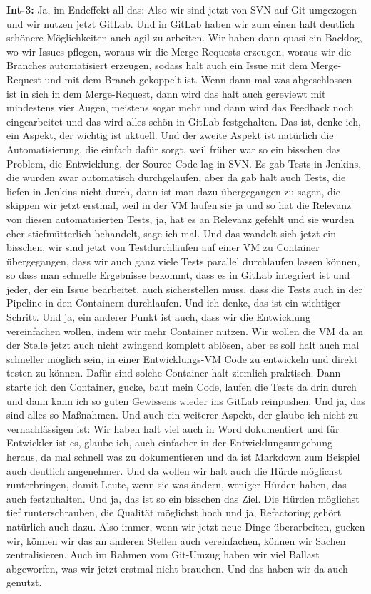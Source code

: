 \textbf{Int-3:} Ja, im Endeffekt all das: Also wir sind jetzt von SVN auf Git umgezogen und wir nutzen jetzt GitLab. Und in GitLab haben wir zum einen halt deutlich schönere Möglichkeiten auch agil zu arbeiten. Wir haben dann quasi ein Backlog, wo wir Issues pflegen, woraus wir die Merge-Requests erzeugen, woraus wir die Branches automatisiert erzeugen, sodass halt auch ein Issue mit dem Merge-Request und mit dem Branch gekoppelt ist. Wenn dann mal was abgeschlossen ist in sich in dem Merge-Request, dann wird das halt auch gereviewt mit mindestens vier Augen, meistens sogar mehr und dann wird das Feedback noch eingearbeitet und das wird alles schön in GitLab festgehalten. Das ist, denke ich, ein Aspekt, der wichtig ist aktuell. Und der zweite Aspekt ist natürlich die Automatisierung, die einfach dafür sorgt, weil früher war so ein bisschen das Problem, die Entwicklung, der Source-Code lag in SVN. Es gab Tests in Jenkins, die wurden zwar automatisch durchgelaufen, aber da gab halt auch Tests, die liefen in Jenkins nicht durch, dann ist man dazu übergegangen zu sagen, die skippen wir jetzt erstmal, weil in der VM laufen sie ja und so hat die Relevanz von diesen automatisierten Tests, ja, hat es an Relevanz gefehlt und sie wurden eher stiefmütterlich behandelt, sage ich mal. Und das wandelt sich jetzt ein bisschen, wir sind jetzt von Testdurchläufen auf einer VM zu Container übergegangen, dass wir auch ganz viele Tests parallel durchlaufen lassen können, so dass man schnelle Ergebnisse bekommt, dass es in GitLab integriert ist und jeder, der ein Issue bearbeitet, auch sicherstellen muss, dass die Tests auch in der Pipeline in den Containern durchlaufen. Und ich denke, das ist ein wichtiger Schritt. Und ja, ein anderer Punkt ist auch, dass wir die Entwicklung vereinfachen wollen, indem wir mehr Container nutzen. Wir wollen die VM da an der Stelle jetzt auch nicht zwingend komplett ablösen, aber es soll halt auch mal schneller möglich sein, in einer Entwicklungs-VM Code zu entwickeln und direkt testen zu können. Dafür sind solche Container halt ziemlich praktisch. Dann starte ich den Container, gucke, baut mein Code, laufen die Tests da drin durch und dann kann ich so guten Gewissens wieder ins GitLab reinpushen. Und ja, das sind alles so Maßnahmen. Und auch ein weiterer Aspekt, der glaube ich nicht zu vernachlässigen ist: Wir haben halt viel auch in Word dokumentiert und für Entwickler ist es, glaube ich, auch einfacher in der Entwicklungsumgebung heraus, da mal schnell was zu dokumentieren und da ist Markdown zum Beispiel auch deutlich angenehmer. Und da wollen wir halt auch die Hürde möglichst runterbringen, damit Leute, wenn sie was ändern, weniger Hürden haben, das auch festzuhalten. Und ja, das ist so ein bisschen das Ziel. Die Hürden möglichst tief runterschrauben, die Qualität möglichst hoch und ja, Refactoring gehört natürlich auch dazu. Also immer, wenn wir jetzt neue Dinge überarbeiten, gucken wir, können wir das an anderen Stellen auch vereinfachen, können wir Sachen zentralisieren. Auch im Rahmen vom Git-Umzug haben wir viel Ballast abgeworfen, was wir jetzt erstmal nicht brauchen. Und das haben wir da auch genutzt. \\
